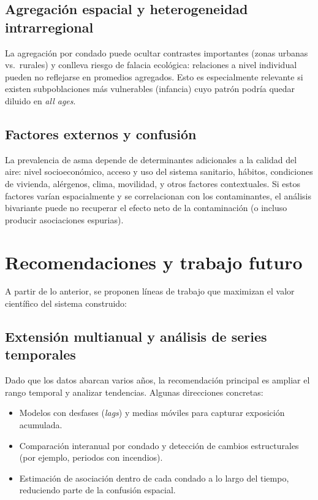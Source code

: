 \subsection{Agregación espacial y heterogeneidad intrarregional}
La agregación por condado puede ocultar contrastes importantes (zonas urbanas vs.\ rurales) y conlleva riesgo de
falacia ecológica: relaciones a nivel individual pueden no reflejarse en promedios agregados. Esto es especialmente
relevante si existen subpoblaciones más vulnerables (infancia) cuyo patrón podría quedar diluido en \textit{all ages}.

\subsection{Factores externos y confusión}
La prevalencia de asma depende de determinantes adicionales a la calidad del aire: nivel socioeconómico, acceso y
uso del sistema sanitario, hábitos, condiciones de vivienda, alérgenos, clima, movilidad, y otros factores
contextuales. Si estos factores varían espacialmente y se correlacionan con los contaminantes, el análisis bivariante
puede no recuperar el efecto neto de la contaminación (o incluso producir asociaciones espurias).

\section{Recomendaciones y trabajo futuro}
A partir de lo anterior, se proponen líneas de trabajo que maximizan el valor científico del sistema construido:

\subsection{Extensión multianual y análisis de series temporales}
Dado que los datos abarcan varios años, la recomendación principal es ampliar el rango temporal y analizar tendencias.
Algunas direcciones concretas:
\begin{itemize}
  \item Modelos con desfases (\textit{lags}) y medias móviles para capturar exposición acumulada.
  \item Comparación interanual por condado y detección de cambios estructurales (por ejemplo, periodos con incendios).
  \item Estimación de asociación dentro de cada condado a lo largo del tiempo, reduciendo parte de la confusión espacial.
\end{itemize}

